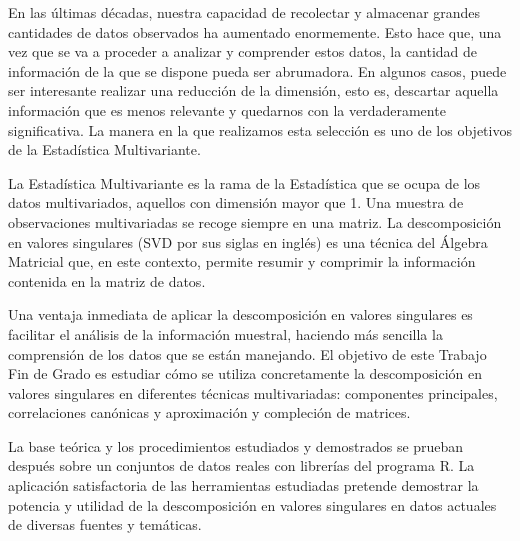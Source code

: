 En las últimas décadas, nuestra capacidad de recolectar y almacenar grandes cantidades de datos observados ha aumentado enormemente. Esto hace que, una vez que se va a proceder a analizar y comprender estos datos, la cantidad de información de la que se dispone pueda ser abrumadora. En algunos casos, puede ser interesante realizar una reducción de la dimensión, esto es, descartar aquella información que es menos relevante y quedarnos con la verdaderamente significativa. La manera en la que realizamos esta selección es uno de los objetivos de la Estadística Multivariante.

La Estadística Multivariante es la rama de la Estadística que se ocupa de los datos multivariados, aquellos con dimensión mayor que 1. Una muestra de observaciones multivariadas se recoge siempre en una matriz. La descomposición en valores singulares (SVD por sus siglas en inglés) es una técnica del Álgebra Matricial que, en este contexto, permite resumir y comprimir la información contenida en la matriz de datos.

Una ventaja inmediata de aplicar la descomposición en valores singulares es facilitar el análisis de la información muestral, haciendo más sencilla la comprensión de los datos que se están manejando. El objetivo de este Trabajo Fin de Grado es estudiar cómo se utiliza concretamente la descomposición en valores singulares en diferentes técnicas multivariadas: componentes principales, correlaciones canónicas y aproximación y compleción de matrices. 

La base teórica y los procedimientos estudiados y demostrados se prueban después sobre un
conjuntos de datos reales con librerías del programa R. La aplicación satisfactoria de las herramientas estudiadas pretende demostrar la potencia y utilidad de la descomposición en valores singulares en datos actuales de diversas fuentes y temáticas.

